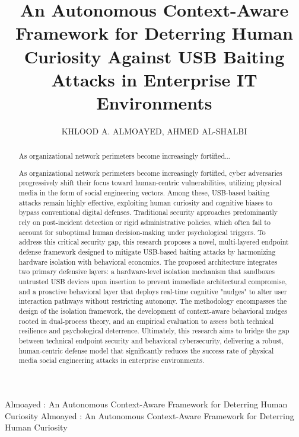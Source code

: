 \documentclass{ieeeaccess}
\begin{document}
\history{}
\doi{}

\title{An Autonomous Context-Aware Framework for Deterring Human Curiosity Against USB Baiting Attacks in Enterprise IT Environments}

\author{\uppercase{Khlood A. Almoayed}, \uppercase{Ahmed Al-Shalbi}}

\address[1]{Information Technology Department, Faculty of Computer Science and Information Technology, Sana'a University, Sana'a, Yemen}

\tfootnote{}

\markboth
{Almoayed \headeretal: An Autonomous Context-Aware Framework for Deterring Human Curiosity}
{Almoayed \headeretal: An Autonomous Context-Aware Framework for Deterring Human Curiosity}


\clearpage %

\begin{abstract}
As organizational network perimeters become increasingly fortified...

As organizational network perimeters become increasingly fortified, cyber adversaries progressively shift their focus toward human-centric vulnerabilities, utilizing physical media in the form of social engineering vectors. Among these, USB-based baiting attacks remain highly effective, exploiting human curiosity and cognitive biases to bypass conventional digital defenses. Traditional security approaches predominantly rely on post-incident detection or rigid administrative policies, which often fail to account for suboptimal human decision-making under psychological triggers. To address this critical security gap, this research proposes a novel, multi-layered endpoint defense framework designed to mitigate USB-based baiting attacks by harmonizing hardware isolation with behavioral economics. The proposed architecture integrates two primary defensive layers: a hardware-level isolation mechanism that sandboxes untrusted USB devices upon insertion to prevent immediate architectural compromise, and a proactive behavioral layer that deploys real-time cognitive "nudges" to alter user interaction pathways without restricting autonomy. The methodology encompasses the design of the isolation framework, the development of context-aware behavioral nudges rooted in dual-process theory, and an empirical evaluation to assess both technical resilience and psychological deterrence. Ultimately, this research aims to bridge the gap between technical endpoint security and behavioral cybersecurity, delivering a robust, human-centric defense model that significantly reduces the success rate of physical media social engineering attacks in enterprise environments.
\end{abstract}
\end{document}
